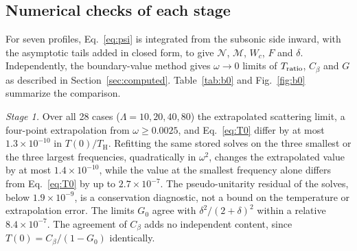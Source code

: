 \documentclass[10pt,a4paper]{article}
\newcommand{\HawkingT}{T_{\mathrm H}}
\begin{document}
\subsection{Numerical checks of each stage}
\label{sec:checks}
For seven profiles, Eq.~\eqref{eq:psi} is integrated from the subsonic side
inward, with the asymptotic tails added in closed form, to give $\mathcal{N}$, $\mathcal{M}$,
$W_c$, $F$ and $\delta$. Independently, the boundary-value method gives
$\omega\to0$ limits of $T_{\rm ratio}$, $C_\beta$ and $G$ as described in
Section~\ref{sec:computed}. Table~\ref{tab:b0} and Fig.~\ref{fig:b0}
summarize the comparison.
\begin{table}[ht]
\centering
\small

\caption{Low-frequency offset, $\kappa=1$. Second column: Eq.~\eqref{eq:b0}
from the Taylor coefficients. Third: extrapolation of the (extrapolated) $\omega\to0$ scattering limits
$\Lambda^2[T(0)/\HawkingT-1]$ at $\Lambda=20,40,80$ in $\Lambda^{-2}$ and
$\Lambda^{-4}$; fourth: third minus second. Fifth: largest difference
between the scattering limit and Eq.~\eqref{eq:T0} over $\Lambda=10$--$80$.
Last two columns: $b_1$ from the local expansion and from a fit of the
zero-frequency formula at $\Lambda=28$--$80$ (relative tolerance
$10^{-13}$). $B_3$ and $B_4$, below the rule, are the prediction-first
families.}
\label{tab:b0}
\end{table}

\emph{Stage 1.} Over all 28 cases ($\Lambda=10,20,40,80$) the extrapolated
scattering limit, a four-point extrapolation from $\omega\geq0.0025$, and
Eq.~\eqref{eq:T0} differ by at most $1.3\times10^{-10}$ in
$T(0)/\HawkingT$. Refitting the same stored solves on the three smallest or
the three largest frequencies, quadratically in $\omega^2$, changes the
extrapolated value by at most $1.4\times10^{-10}$, while the value at the
smallest frequency alone differs from Eq.~\eqref{eq:T0} by up to
$2.7\times10^{-7}$. The pseudo-unitarity residual of the solves, below
$1.9\times10^{-9}$, is a conservation diagnostic, not a bound on the
temperature or extrapolation error. The limits $G_0$ agree with
$\delta^2/(2+\delta)^2$ within a relative $8.4\times10^{-7}$. The agreement
of $C_\beta$ adds no independent content, since $T(0)=C_\beta/(1-G_0)$
identically.
\end{document}
